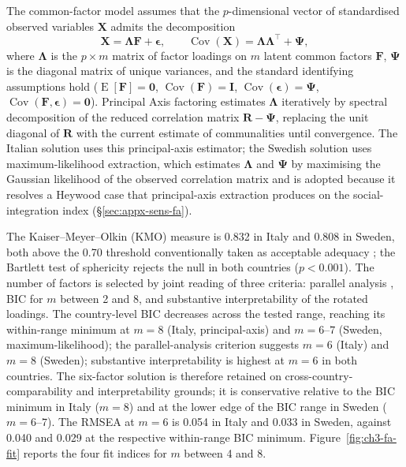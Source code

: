 The common-factor model assumes that the $p$-dimensional vector of standardised observed variables $\mathbf{X}$ admits the decomposition
\begin{equation}
  \mathbf{X} = \boldsymbol{\Lambda}\mathbf{F} + \boldsymbol{\epsilon},
  \qquad
  \operatorname{Cov}(\mathbf{X}) = \boldsymbol{\Lambda}\boldsymbol{\Lambda}^{\top} + \boldsymbol{\Psi},
\end{equation}
where $\boldsymbol{\Lambda}$ is the $p \times m$ matrix of factor loadings on $m$ latent common factors $\mathbf{F}$, $\boldsymbol{\Psi}$ is the diagonal matrix of unique variances, and the standard identifying assumptions hold ($\operatorname{E}[\mathbf{F}] = \mathbf{0}$, $\operatorname{Cov}(\mathbf{F}) = \mathbf{I}$, $\operatorname{Cov}(\boldsymbol{\epsilon}) = \boldsymbol{\Psi}$, $\operatorname{Cov}(\mathbf{F},\boldsymbol{\epsilon}) = \mathbf{0}$). Principal Axis factoring estimates $\boldsymbol{\Lambda}$ iteratively by spectral decomposition of the reduced correlation matrix $\mathbf{R} - \boldsymbol{\Psi}$, replacing the unit diagonal of $\mathbf{R}$ with the current estimate of communalities until convergence. The Italian solution uses this principal-axis estimator; the Swedish solution uses maximum-likelihood extraction, which estimates $\boldsymbol{\Lambda}$ and $\boldsymbol{\Psi}$ by maximising the Gaussian likelihood of the observed correlation matrix and is adopted because it resolves a Heywood case that principal-axis extraction produces on the social-integration index (\S\ref{sec:appx-sens-fa}).

The Kaiser--Meyer--Olkin (KMO) measure is 0.832 in Italy and 0.808 in Sweden, both above the 0.70 threshold conventionally taken as acceptable adequacy \citep{kaiser1974}; the Bartlett test of sphericity \citep{bartlett1950} rejects the null in both countries ($p < 0.001$). The number of factors is selected by joint reading of three criteria: parallel analysis \citep{horn1965}, BIC for $m$ between 2 and 8, and substantive interpretability of the rotated loadings. The country-level BIC decreases across the tested range, reaching its within-range minimum at $m = 8$ (Italy, principal-axis) and $m = 6$--$7$ (Sweden, maximum-likelihood); the parallel-analysis criterion suggests $m = 6$ (Italy) and $m = 8$ (Sweden); substantive interpretability is highest at $m = 6$ in both countries. The six-factor solution is therefore retained on cross-country-comparability and interpretability grounds; it is conservative relative to the BIC minimum in Italy ($m = 8$) and at the lower edge of the BIC range in Sweden ($m = 6$--$7$). The RMSEA at $m = 6$ is 0.054 in Italy and 0.033 in Sweden, against 0.040 and 0.029 at the respective within-range BIC minimum. Figure~\ref{fig:ch3-fa-fit} reports the four fit indices for $m$ between 4 and 8.


